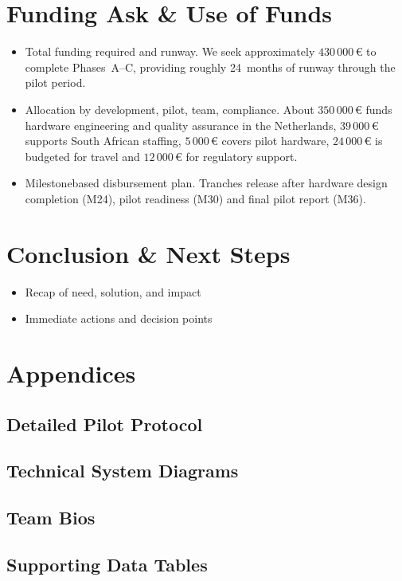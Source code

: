 \documentclass[a4paper,11pt]{article}
\begin{document}
\section{Funding Ask \& Use of Funds}
\begin{itemize}
  \item Total funding required and runway. We seek approximately \(430\,000\,\text{€}\) to complete Phases~A--C, providing roughly 24~months of runway through the pilot period.
  \item Allocation by development, pilot, team, compliance. About \(350\,000\,\text{€}\) funds hardware engineering and quality assurance in the Netherlands, \(39\,000\,\text{€}\) supports South African staffing, \(5\,000\,\text{€}\) covers pilot hardware, \(24\,000\,\text{€}\) is budgeted for travel and \(12\,000\,\text{€}\) for regulatory support.
  \item Milestone\-based disbursement plan. Tranches release after hardware design completion (M24), pilot readiness (M30) and final pilot report (M36).
\end{itemize}

\section{Conclusion \& Next Steps}
\begin{itemize}
  \item Recap of need, solution, and impact
  \item Immediate actions and decision points
\end{itemize}

\newpage


\printbibliography

\appendix
\section{Appendices}
\subsection{Detailed Pilot Protocol}
\subsection{Technical System Diagrams}
\subsection{Team Bios}
\subsection{Supporting Data Tables}
\end{document}

